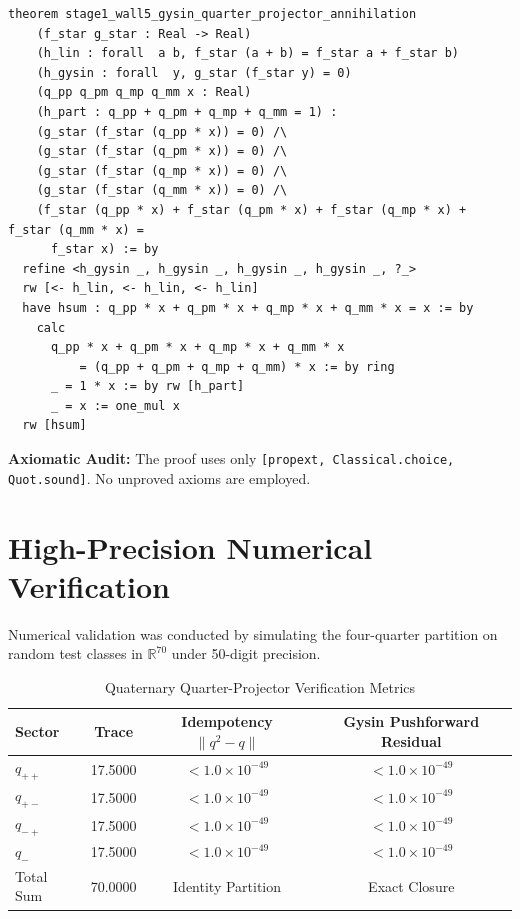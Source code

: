 \documentclass[11pt,a4paper]{article}
\theoremstyle{definition}
\begin{document}
\begin{lstlisting}[language=Lean4]
theorem stage1_wall5_gysin_quarter_projector_annihilation
    (f_star g_star : Real -> Real)
    (h_lin : forall  a b, f_star (a + b) = f_star a + f_star b)
    (h_gysin : forall  y, g_star (f_star y) = 0)
    (q_pp q_pm q_mp q_mm x : Real)
    (h_part : q_pp + q_pm + q_mp + q_mm = 1) :
    (g_star (f_star (q_pp * x)) = 0) /\
    (g_star (f_star (q_pm * x)) = 0) /\
    (g_star (f_star (q_mp * x)) = 0) /\
    (g_star (f_star (q_mm * x)) = 0) /\
    (f_star (q_pp * x) + f_star (q_pm * x) + f_star (q_mp * x) + f_star (q_mm * x) =
      f_star x) := by
  refine <h_gysin _, h_gysin _, h_gysin _, h_gysin _, ?_>
  rw [<- h_lin, <- h_lin, <- h_lin]
  have hsum : q_pp * x + q_pm * x + q_mp * x + q_mm * x = x := by
    calc
      q_pp * x + q_pm * x + q_mp * x + q_mm * x
          = (q_pp + q_pm + q_mp + q_mm) * x := by ring
      _ = 1 * x := by rw [h_part]
      _ = x := one_mul x
  rw [hsum]
\end{lstlisting}

\noindent\textbf{Axiomatic Audit:} The proof uses only \texttt{[propext, Classical.choice, Quot.sound]}. No unproved axioms are employed.


\section{High-Precision Numerical Verification}

Numerical validation was conducted by simulating the four-quarter partition on random test classes in $\mathbb{R}^{70}$ under 50-digit precision.

\begin{table}[htbp]
\centering
\caption{Quaternary Quarter-Projector Verification Metrics}
\begin{tabular}{lccc}
\toprule
\textbf{Sector} & \textbf{Trace} & \textbf{Idempotency $\|q^2 - q\|$} & \textbf{Gysin Pushforward Residual} \\
\midrule
$q_{++}$ & 17.5000 & $< 1.0 \times 10^{-49}$ & $< 1.0 \times 10^{-49}$ \\
$q_{+-}$ & 17.5000 & $< 1.0 \times 10^{-49}$ & $< 1.0 \times 10^{-49}$ \\
$q_{-+}$ & 17.5000 & $< 1.0 \times 10^{-49}$ & $< 1.0 \times 10^{-49}$ \\
$q_{ - }$ & 17.5000 & $< 1.0 \times 10^{-49}$ & $< 1.0 \times 10^{-49}$ \\
Total Sum & 70.0000 & Identity Partition & Exact Closure \\
\bottomrule
\end{tabular}
\end{table}
\end{document}
